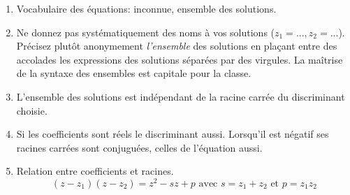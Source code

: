 \begin{rems}
 \begin{enumerate}
  \item Vocabulaire des équations: inconnue, ensemble des solutions.
\item Ne donnez pas systématiquement des noms à vos solutions ($z_1= ..., z_2=...$). Précisez plutôt anonymement \emph{l'ensemble} des solutions en plaçant entre des accolades les expressions des solutions séparées par des virgules. La maîtrise de la syntaxe des ensembles est capitale pour la classe.
\item L'ensemble des solutions est indépendant de la racine carrée du discriminant choisie.
\item Si les coefficients sont réels le discriminant aussi. Lorsqu'il est négatif ses racines carrées sont conjuguées, celles de l'équation aussi.
\item Relation entre coefficients et racines. 
\begin{displaymath}
  (z-z_1)(z-z_2) = z^2-sz+p \text{ avec } s=z_1+z_2 \text{ et } p = z_1z_2
\end{displaymath}
 \end{enumerate}
\end{rems}

